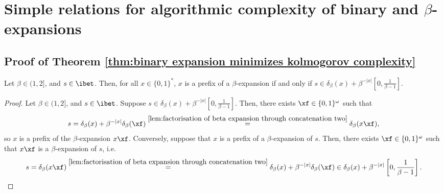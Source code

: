 \section{\texorpdfstring{Simple relations for algorithmic complexity of binary and $\beta$-expansions}{Simple relations for algorithmic complexity of binary and -expansions}}
\label{app:greedy binary expansion is a minimizer of Kolmogorov complexity}

\subsection{Proof of Theorem \ref{thm:binary expansion minimizes kolmogorov complexity}}


\begin{lemma}\label{lem:condition prefix beta expansion of x}
	Let $\beta \in (1,2]$, and $s \in \ibet$. Then, for all $x \in \{0,1\}^\ast$, $x$ is a prefix of a $\beta$-expansion if and only if $s \in \delta_\beta(x) +\beta^{-|x|}\left[0,\frac{1}{\beta - 1}\right]$.
\end{lemma}
\begin{proof}
	Let $\beta \in (1,2]$, and $s \in \ibet$. Suppose $s \in \delta_\beta(x) +\beta^{-|x|}\left[0,\frac{1}{\beta - 1}\right]$. Then, there exists $\xf \in \{0,1\}^\omega$ such that
	\begin{equation}
		s = \delta_\beta(x) +\beta^{-|x|}\delta_\beta(\xf) \overset{\ref{lem:factorisation of beta expansion through concatenation two}}{=} \delta_\beta(x  \xf),
	\end{equation}
	so $x$ is a prefix of the $\beta$-expansion $x  \xf$. Conversely, suppose that $x$ is a prefix of a $\beta$-expansion of $s$. Then, there exists $\xf \in \{0,1\}^\omega$ such that $x  \xf$ is a $\beta$-expansion of $s$, i.e.
	\begin{equation}
		s = \delta_\beta(x  \xf)  \overset{\ref{lem:factorisation of beta expansion through concatenation two}}{=} \delta_\beta(x) +\beta^{-|x|}\delta_\beta(\xf) \in \delta_\beta(x) + \beta^{-|x|}\left[0,\frac{1}{\beta - 1}\right].
	\end{equation}
\end{proof}


